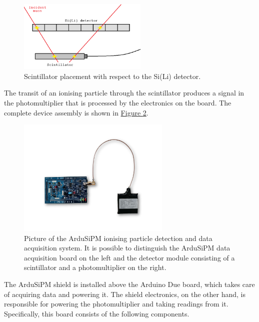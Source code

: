 \begin{figure}[h!]
    \centering
    \includegraphics[width=0.55\textwidth]{Images/chap3/scintillator_sensor_detail.png}
    \caption{Scintillator placement with respect to the Si(Li) detector.}
    \label{figScintillatorSiLi}
\end{figure}

\par
The transit of an ionising particle through the scintillator produces a signal in the photomultiplier that is processed by the electronics on the board. The complete device assembly is shown in \hyperref[figArduiSiPM]{Figure \ref{figArduiSiPM}}.

\begin{figure}[h!]
    \centering
    \includegraphics[width=0.65\textwidth]{Images/chap3/ardusipm_cropped.pdf}
    \caption{Picture of the ArduSiPM ionising particle detection and data acquisition system. It is possible to distinguish the ArduSiPM data acquisition board on the left and the detector module consisting of a scintillator and a photomultiplier on the right.}
    \label{figArduiSiPM}
\end{figure}

The ArduSiPM shield is installed above the Arduino Due board, which takes care of acquiring data and powering it. The shield electronics, on the other hand, is responsible for powering the photomultiplier and taking readings from it. Specifically, this board consists of the following components.

